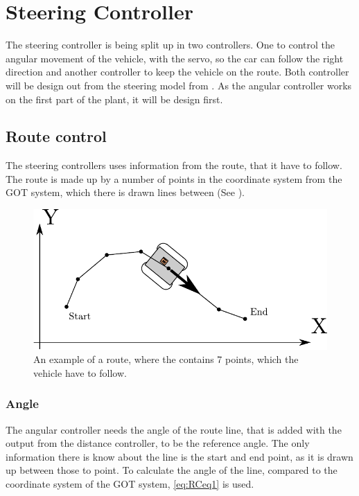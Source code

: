 \section{Steering Controller}\label{sec:steeringController}
The steering controller is being split up in two controllers. One to control the angular movement of the vehicle, with the servo, so the car can follow the right direction and another controller to keep the vehicle on the route. Both controller will be design out from the steering model from . As the angular controller works on the first part of the plant, it will be design first.





\subsection{Route control}
The steering controllers uses information from the route, that it have to follow. The route is made up by a number of points in the coordinate system from the GOT system, which there is drawn lines between (See ).

\begin{figure}[H]
 	\centering
 	\includegraphics[scale=0.7]{figures/stepsGoT}
 	\caption{An example of a route, where the contains 7 points, which the vehicle have to follow.}
 	\label{fig:RCfig1}
\end{figure}

\subsubsection{Angle}
The angular controller needs the angle of the route line, that is added with the output from the distance controller, to be the reference angle. The only information there is know about the line is the start and end point, as it is drawn up between those to point. To calculate the angle of the line, compared to the coordinate system of the GOT system, \eqref{eq:RCeq1} is used.

